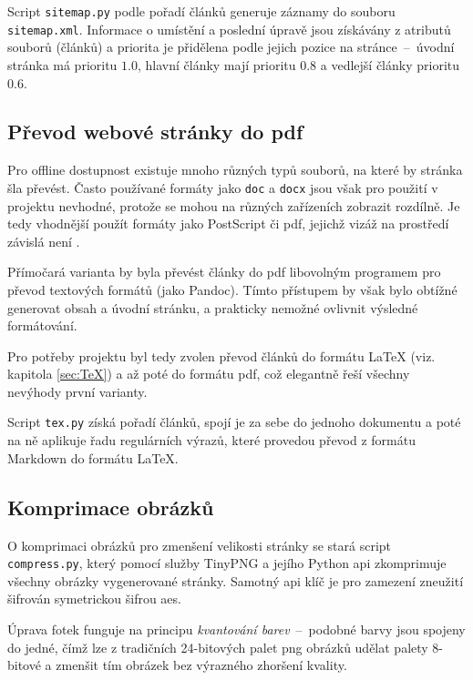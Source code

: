 \documentclass[a4paper, 12pt]{article}
\newcommand*{\fullref}[1]{\hyperref[{#1}]{\ref*{#1}}}
\begin{document}
  Script \texttt{sitemap.py} podle pořadí článků generuje záznamy do souboru \texttt{sitemap.xml}. Informace o umístění a poslední úpravě jsou získávány z atributů souborů (článků) a priorita je přidělena podle jejich pozice na stránce~--~úvodní stránka má prioritu $1.0$, hlavní články mají prioritu $0.8$ a vedlejší články prioritu $0.6$.


  \subsection{Převod webové stránky do \acrshort{pdf}} \label{sec:Převod webové stránky do PDF}
  Pro offline dostupnost existuje mnoho různých typů souborů, na které by stránka šla převést. Často používané formáty jako \texttt{doc} a \texttt{docx} jsou však pro použití v projektu nevhodné, protože se mohou na různých zařízeních zobrazit rozdílně. Je tedy vhodnější použít formáty jako PostScript či \gls{pdf}, jejichž vizáž na prostředí závislá není \cite{history-of-pdf}.

  Přímočará varianta by byla převést články do \gls{pdf} libovolným programem pro převod textových formátů (jako Pandoc). Tímto přístupem by však bylo obtížné generovat obsah a úvodní stránku, a prakticky nemožné ovlivnit výsledné formátování.

  Pro potřeby projektu byl tedy zvolen převod článků do formátu \LaTeX{} (viz. kapitola \fullref{sec:TeX}) a až poté do formátu \gls{pdf}, což elegantně řeší všechny nevýhody první varianty.

  Script \texttt{tex.py} získá pořadí článků, spojí je za sebe do jednoho dokumentu a poté na ně aplikuje řadu regulárních výrazů, které provedou převod z formátu Markdown do formátu \LaTeX.


  \subsection{Komprimace obrázků}
  O komprimaci obrázků pro zmenšení velikosti stránky se stará script \texttt{compress.py}, který pomocí služby TinyPNG a jejího Python \gls{api} zkomprimuje všechny obrázky vygenerované stránky. Samotný \gls{api} klíč je pro zamezení zneužití šifrován symetrickou šifrou \gls{aes}.

  Úprava fotek funguje na principu \emph{kvantování barev}~--~podobné barvy jsou spojeny do jedné, čímž lze z tradičních 24-bitových palet \gls{png} obrázků udělat palety 8-bitové a zmenšit tím obrázek bez výrazného zhoršení kvality.
\end{document}
